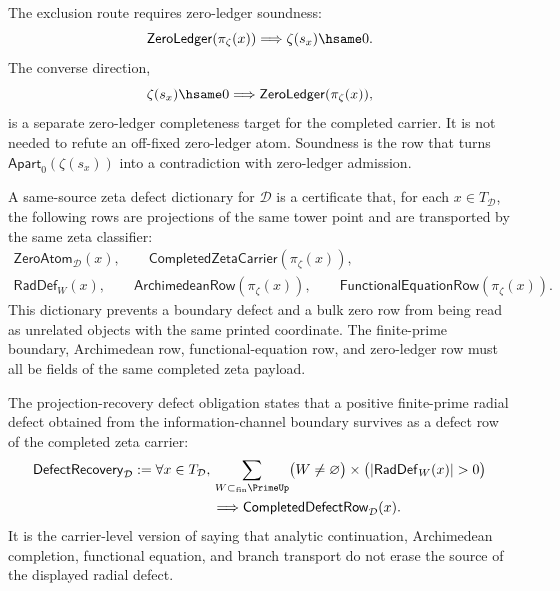 \begin{principle}
\label{prin:zero-ledger-soundness-completeness-boundary}
The exclusion route requires zero-ledger soundness:
$$
\mathsf{ZeroLedger}(\pi_\zeta(x))
\Longrightarrow
\zeta(s_x)\hsame0.
$$
The converse direction,
$$
\zeta(s_x)\hsame0
\Longrightarrow
\mathsf{ZeroLedger}(\pi_\zeta(x)),
$$
is a separate zero-ledger completeness target for the completed carrier.
It is not needed to refute an off-fixed zero-ledger atom.  Soundness is
the row that turns $\mathsf{Apart}_{0}(\zeta(s_x))$ into a contradiction
with zero-ledger admission.
\end{principle}

\begin{definition}
\label{def:same-source-zeta-defect-dictionary}
A same-source zeta defect dictionary for $\mathcal D$ is a certificate
that, for each $x\in T_{\mathcal D}$, the following rows are projections
of the same tower point and are transported by the same zeta classifier:
$$
\begin{gathered}
\mathsf{ZeroAtom}_{\mathcal D}(x),\qquad
\mathsf{CompletedZetaCarrier}(\pi_\zeta(x)),\\
\mathsf{RadDef}_{W}(x),\qquad
\mathsf{ArchimedeanRow}(\pi_\zeta(x)),\qquad
\mathsf{FunctionalEquationRow}(\pi_\zeta(x)).
\end{gathered}
$$
This dictionary prevents a boundary defect and a bulk zero row from being
read as unrelated objects with the same printed coordinate.  The
finite-prime boundary, Archimedean row, functional-equation row, and
zero-ledger row must all be fields of the same completed zeta payload.
\end{definition}

\begin{definition}
\label{def:projection-recovery-defect-obligation}
The projection-recovery defect obligation states that a positive
finite-prime radial defect obtained from the information-channel boundary
survives as a defect row of the completed zeta carrier:
$$
\begin{aligned}
\mathsf{DefectRecovery}_{\mathcal D}
:=
\forall x\in T_{\mathcal D},\,&
\sum_{W\subset_{\mathrm{fin}}\PrimeUp}
\bigl(W\neq\varnothing\bigr)
\times
\bigl(|\mathsf{RadDef}_{W}(x)|>0\bigr)
\\
&\Longrightarrow
\mathsf{CompletedDefectRow}_{\mathcal D}(x).
\end{aligned}
$$
It is the carrier-level version of saying that analytic continuation,
Archimedean completion, functional equation, and branch transport do not
erase the source of the displayed radial defect.
\end{definition}

